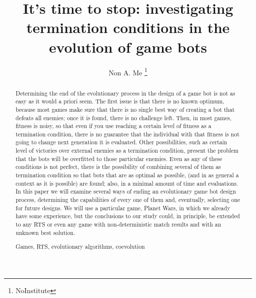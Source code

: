 \documentclass[runningheads,a4paper]{llncs}
\newcommand{\keywords}[1]{\par\addvspace\baselineskip
\noindent\keywordname\enspace\ignorespaces#1}
\begin{document}
\mainmatter  %

\title{It's time to stop: investigating termination conditions in the evolution of game bots}


%
%
\author{Non A. Me%
\thanks{NoInstitute}}
%


%
%

\maketitle


\begin{abstract}
Determining the end of the evolutionary process in the design of a
game bot is not as easy as it would a priori seem. The first issue is
that there is no known optimum, because most games make sure that there is
no single best way of creating a bot that defeats all enemies; once it
is found, there is no challenge left. Then, in
most games, fitness is noisy, so that even if you use reaching a certain level
of fitness as a termination condition, there is no guarantee that the
individual with that fitness is not going to change next
generation it is evaluated. Other possibilities, such as certain level
of victories over external enemies as a termination condition,
present the problem that the bots will be overfitted to
those particular enemies. Even as any of these conditions is not
perfect, there is the possibility of combining several of them as
termination condition so that bots that are as optimal as possible,
(and in as general a context as it is possible) are found; also,
in a minimal amount of time and evaluations. In this paper
we will examine several ways of ending an evolutionary
game bot design process, determining the capabilities of every one of
them and, eventually, selecting one for future designs. We will use a particular
game, Planet Wars, in which we already have some experience, but the
conclusions to our study could, in principle, be extended to any RTS
or even any game with non-deterministic match results and with an
unknown best solution.
\keywords{Games, RTS, evolutionary algorithms, coevolution}
\end{abstract}
\end{document}
